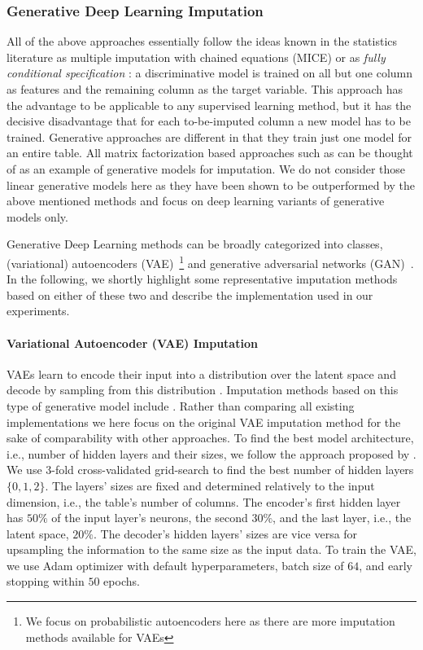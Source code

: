 \subsubsection{Generative Deep Learning Imputation}
\label{sec:generative_imputation}
%
All of the above approaches essentially follow the ideas known in the statistics literature as multiple imputation with chained equations (MICE) \citep{Little} or as {\em fully conditional specification} \citep{vanBuuren2018}: a discriminative model is trained on all but one column as features and the remaining column as the target variable. This approach has the advantage to be applicable to any supervised learning method, but it has the decisive disadvantage that for each to-be-imputed column a new model has to be trained. Generative approaches are different in that they train just one model for an entire table. All matrix factorization based approaches such as \citep{Troyanskaya2001,Koren2009,Mazumder2010} can be thought of as an example of generative models for imputation. We do not consider those linear generative models here as they have been shown to be outperformed by the above mentioned methods and focus on deep learning variants of generative models only.

Generative Deep Learning methods can be broadly categorized into classes, (variational) autoencoders (VAE)~\citep{VAE}\footnote{We focus on probabilistic autoencoders here as there are more imputation methods available for VAEs} and generative adversarial networks (GAN)~\citep{GAN}. In the following, we shortly highlight some representative imputation methods based on either of these two and describe the implementation used in our experiments.

\paragraph{Variational Autoencoder (VAE) Imputation}
%
VAEs learn to encode their input into a distribution over the latent space and decode by sampling from this distribution \citep{VAE}. Imputation methods based on this type of generative model include \cite{HIVAE, VAE_for_genomic_data, VAEM}. Rather than comparing all existing implementations we here focus on the original VAE imputation method for the sake of comparability with other approaches. To find the best model architecture, i.e., number of hidden layers and their sizes, we follow the approach proposed by \cite{CaminoVAE}. We use 3-fold cross-validated grid-search to find the best number of hidden layers $\{0, 1, 2\}$. The layers' sizes are fixed and determined relatively to the input dimension, i.e., the table's number of columns. The encoder's first hidden layer has $50\%$ of the input layer's neurons, the second $30\%$, and the last layer, i.e., the latent space, $20\%$. The decoder's hidden layers' sizes are vice versa for upsampling the information to the same size as the input data.
To train the VAE, we use Adam optimizer with default hyperparameters, batch size of $64$, and early stopping within $50$ epochs.


